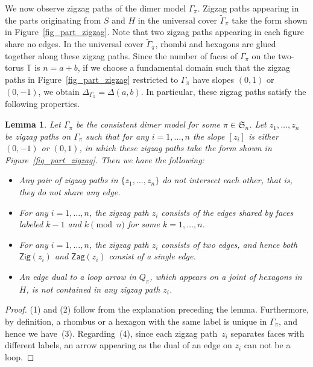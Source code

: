 \documentclass[10pt,a4paper]{amsart}
\numberwithin{equation}{section}
\newtheorem{Lemma}[Theorem]{Lemma}
\theoremstyle{definition}
\newcommand{\TT}{\mathbb{T}}
\newcommand{\fkS}{\mathfrak{S}}
\newcommand{\Zig}{\mathsf{Zig}}
\newcommand{\Zag}{\mathsf{Zag}}
\newcommand{\perm}{\pi}
\begin{document}
We now observe zigzag paths of the dimer model $\Gamma_\perm$.
Zigzag paths appearing in the parts originating from $S$ and $H$ in the universal cover $\widetilde{\Gamma}_\perm$ take the form shown in Figure~\ref{fig_part_zigzag}.
Note that two zigzag paths appearing in each figure share no edges.
In the universal cover $\widetilde{\Gamma}_\perm$, rhombi and hexagons are glued together along these zigzag paths.
Since the number of faces of $\Gamma_\perm$ on the two-torus $\TT$ is $n=a+b$,
if we choose a fundamental domain such that the zigzag paths in Figure~\ref{fig_part_zigzag} restricted to $\Gamma_\perm$ have slopes $(0,1)$ or $(0,-1)$,
we obtain $\Delta_{\Gamma_\perm}=\Delta(a,b)$. In particular, these zigzag paths satisfy the following properties.

\begin{Lemma}\label{lem_zigzag_nointersection}
Let $\Gamma_\perm$ be the consistent dimer model for some $\perm\in\fkS_n$.
Let $z_1, \dots, z_n$ be zigzag paths on $\Gamma_\perm$ such that for any $i=1, \dots, n$ the slope $[z_i]$ is either $(0,-1)$ or $(0,1)$,
in which these zigzag paths take the form shown in Figure~{\rm \ref{fig_part_zigzag}}.
Then we have the following:
\begin{itemize}\itemsep=0pt
\item[$(1)$] Any pair of zigzag paths in $\{z_1, \dots, z_n\}$ do not intersect each other, that is, they do not share any edge.
\item[$(2)$] For any $i=1, \dots, n$, the zigzag path $z_i$ consists of the edges shared by faces labeled $k-1$ and $k$$\pmod n$ for some $k=1, \dots, n$.
\item[$(3)$] For any $i=1, \dots, n$, the zigzag path $z_i$ consists of two edges, and hence both $\Zig(z_i)$ and $\Zag(z_i)$ consist of a single edge.
\item[$(4)$] An edge dual to a loop arrow in $Q_\perm$, which appears on a joint of hexagons in $H$, is not contained in any zigzag path $z_i$.
\end{itemize}
\end{Lemma}

\begin{proof}
(1) and (2) follow from the explanation preceding the lemma.
Furthermore, by definition, a rhombus or a hexagon with the same label is unique in $\Gamma_\perm$, and hence we have~(3).
Regarding~(4), since each zigzag path~$z_i$ separates faces with different labels, an arrow appearing as the dual of an edge on $z_i$ can not be a loop.
\end{proof}
\end{document}
